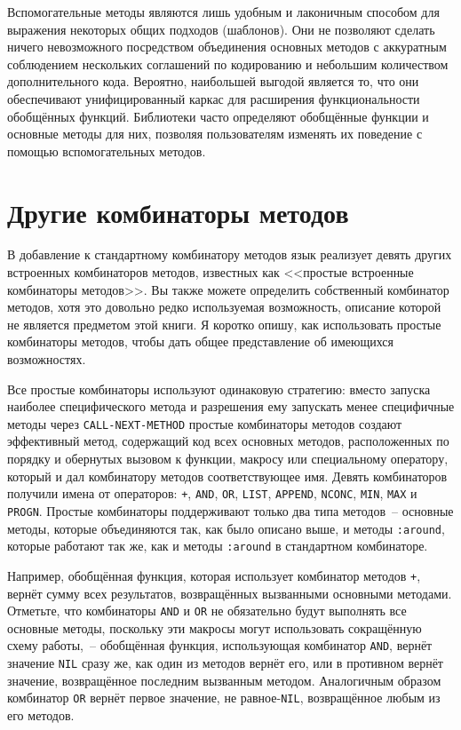 Вспомогательные методы являются лишь удобным и лаконичным способом для выражения некоторых
общих подходов (шаблонов).  Они не позволяют сделать ничего невозможного посредством
объединения основных методов с аккуратным соблюдением нескольких соглашений по кодированию
и небольшим количеством дополнительного кода. Вероятно, наибольшей выгодой является то,
что они обеспечивают унифицированный каркас для расширения функциональности обобщённых
функций.  Библиотеки часто определяют обобщённые функции и основные методы для них,
позволяя пользователям изменять их поведение с помощью вспомогательных методов.

\section{Другие комбинаторы методов}

В добавление к стандартному комбинатору методов язык реализует девять других встроенных
комбинаторов методов, известных как <<простые встроенные комбинаторы методов>>.  Вы также
можете определить собственный комбинатор методов, хотя это довольно редко используемая
возможность, описание которой не является предметом этой книги.  Я коротко опишу, как
использовать простые комбинаторы методов, чтобы дать общее представление об имеющихся
возможностях.

Все простые комбинаторы используют одинаковую стратегию: вместо запуска наиболее
специфического метода и разрешения ему запускать менее специфичные методы через
\lstinline{CALL-NEXT-METHOD} простые комбинаторы методов создают эффективный метод, содержащий
код всех основных методов, расположенных по порядку и обернутых вызовом к функции,
макросу или специальному оператору, который и дал комбинатору методов соответствующее имя.
Девять комбинаторов получили имена от операторов: \lstinline{+}, \lstinline{AND}, \lstinline{OR},
\lstinline{LIST}, \lstinline{APPEND}, \lstinline{NCONC}, \lstinline{MIN}, \lstinline{MAX} и \lstinline{PROGN}.  Простые
комбинаторы поддерживают только два типа методов~-- основные методы, которые объединяются
так, как было описано выше, и методы \lstinline{:around}, которые работают так же, как и методы
\lstinline{:around} в стандартном комбинаторе.

Например, обобщённая функция, которая использует комбинатор методов \lstinline{+}, вернёт сумму
всех результатов, возвращённых вызванными основными методами.  Отметьте, что комбинаторы
\lstinline{AND} и \lstinline{OR} не обязательно будут выполнять все основные методы, поскольку эти
макросы могут использовать сокращённую схему работы,~-- обобщённая функция, использующая
комбинатор \lstinline{AND}, вернёт значение \lstinline{NIL} сразу же, как один из методов вернёт его,
или в противном вернёт значение, возвращённое последним вызванным методом.  Аналогичным
образом комбинатор \lstinline{OR} вернёт первое значение, не равное-\lstinline{NIL}, возвращённое
любым из его методов.

